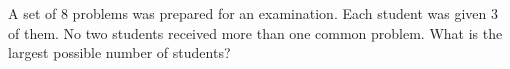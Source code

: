 A set of $8$ problems was prepared for an examination. Each student was given $3$ of them. No two students received more than one common problem. What is the largest possible number of students?